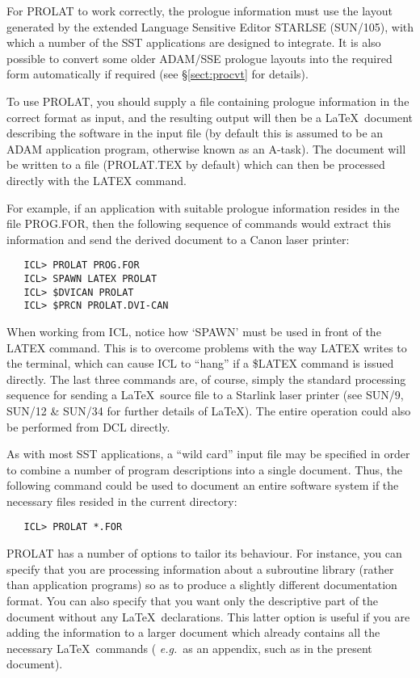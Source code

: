 For PROLAT to work correctly, the prologue information must use the layout
generated by the extended Language Sensitive Editor STARLSE (SUN/105), with
which a number of the SST applications are designed to integrate. 
It is also possible to convert some older ADAM/SSE prologue layouts into the
required form automatically if required (see \S\ref{sect:procvt} for
details). 

To use PROLAT, you should supply a file containing prologue information in
the correct format as input, and the resulting output will then be a \LaTeX\
document describing the software in the input file (by default this is
assumed to be an ADAM application program, otherwise known as an A-task). 
The document will be written to a file (PROLAT.TEX by default) which can
then be processed directly with the LATEX command. 

For example, if an application with suitable prologue information resides in 
the file PROG.FOR, then the following sequence of commands would extract this 
information and send the derived document to a Canon laser printer:

\begin{verbatim}
   ICL> PROLAT PROG.FOR
   ICL> SPAWN LATEX PROLAT
   ICL> $DVICAN PROLAT
   ICL> $PRCN PROLAT.DVI-CAN
\end{verbatim}

When working from ICL, notice how `SPAWN' must be used in front of the LATEX
command.
This is to overcome problems with the way LATEX writes to the terminal, which
can cause ICL to ``hang'' if a \$LATEX command is issued directly. 
The last three commands are, of course, simply the standard processing
sequence for sending a \LaTeX\ source file to a Starlink laser printer (see
SUN/9, SUN/12 \& SUN/34 for further details of \LaTeX). 
The entire operation could also be performed from DCL directly.

As with most SST applications, a ``wild card'' input file may be specified
in order to combine a number of program descriptions into a single document.
Thus, the following command could be used to document an entire software
system if the necessary files resided in the current directory: 

\begin{verbatim}
   ICL> PROLAT *.FOR
\end{verbatim}

PROLAT has a number of options to tailor its behaviour.
For instance, you can specify that you are processing information about a
subroutine library (rather than application programs) so as to produce a
slightly different documentation format. 
You can also specify that you want only the descriptive part of the document
without any \LaTeX\ declarations.
This latter option is useful if you are adding the information to a larger
document which already contains all the necessary \LaTeX\ commands ({\em
e.g.}\ as an appendix, such as in the present document). 

